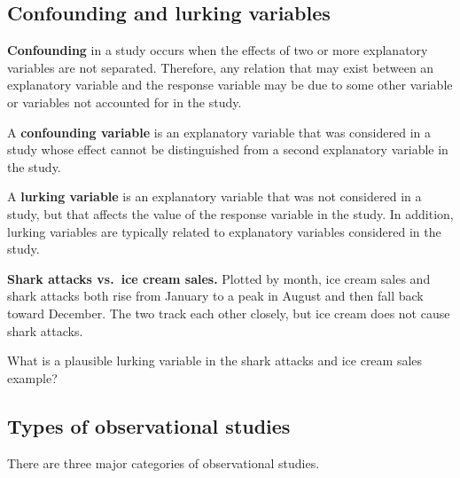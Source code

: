 \documentclass{ximera}
\begin{document}
\subsection*{Confounding and lurking variables}

\begin{definition}
\textbf{Confounding} in a study occurs when the effects of two or more explanatory variables are not separated. Therefore, any relation that may exist between an explanatory variable and the response variable may be due to some other variable or variables not accounted for in the study.

A \textbf{confounding variable} is an explanatory variable that was considered in a study whose effect cannot be distinguished from a second explanatory variable in the study.

A \textbf{lurking variable} is an explanatory variable that was not considered in a study, but that affects the value of the response variable in the study. In addition, lurking variables are typically related to explanatory variables considered in the study.
\end{definition}

\textbf{Shark attacks vs.\ ice cream sales.} Plotted by month, ice cream sales and shark attacks both rise from January to a peak in August and then fall back toward December. The two track each other closely, but ice cream does not cause shark attacks.

\begin{problem}
What is a plausible lurking variable in the shark attacks and ice cream sales example?
\begin{multipleChoice}
\end{multipleChoice}
\end{problem}

\subsection*{Types of observational studies}

There are three major categories of observational studies.
\end{document}
